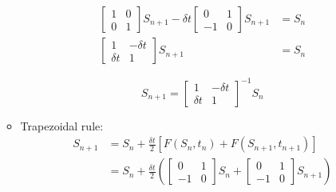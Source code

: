 \documentclass[a4paper,11pt]{report}
\begin{document}
\begin{enumerate}
\begin{itemize}
    \begin{equation*}
    \begin{aligned}
    \begin{bmatrix} 1 & 0 \\ 0 & 1 \end{bmatrix} S_{n+1} - \delta t 
    \begin{bmatrix} 0 & 1 \\ -1 & 0 \end{bmatrix} S_{n+1} &= S_{n} \\
    \begin{bmatrix} 1 & -\delta t \\ \delta t & 1 \end{bmatrix} S_{n+1} 
    &= S_{n}
    \end{aligned} 
    \end{equation*}

    \begin{equation*}
    S_{n+1} = \begin{bmatrix} 1 & -\delta t \\ \delta t & 1 \end{bmatrix}^{-1}
    S_{n}
    \end{equation*}

    \vspace{1 cm}

    \item Trapezoidal rule:
    \begin{equation*}
    \begin{aligned}
    S_{n+1} &= S_{n} + \frac{\delta t}{2} \left[ F(S_{n}, t_{n}) + F(S_{n+1}, 
    t_{n+1}) \right] \\
            &= S_{n} + \frac{\delta t}{2} \left( \begin{bmatrix} 0 & 1 \\ 
    -1 & 0 \end{bmatrix} S_{n} + \begin{bmatrix} 0 & 1 \\ -1 & 0 \end{bmatrix}
    S_{n+1} \right)
    \end{aligned}
    \end{equation*}
     

\end{itemize}
\end{enumerate}
\end{document}
